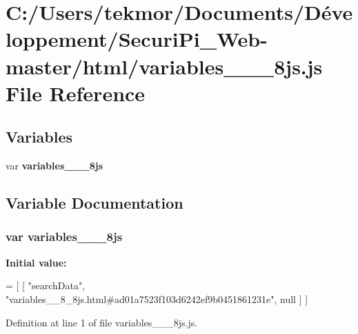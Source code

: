 \section{C\+:/\+Users/tekmor/\+Documents/\+Développement/\+Securi\+Pi\+\_\+\+Web-\/master/html/variables\+\_\+\+\_\+\_\+8js.js File Reference}
\label{variables____8__8js_8js}
\subsection*{Variables}
\begin{DoxyCompactItemize}
\item 
var {\bf variables\+\_\+\+\_\+\_\+8js}
\end{DoxyCompactItemize}


\subsection{Variable Documentation}
\subsubsection[{variables\+\_\+\+\_\+8\+\_\+8js}]{\setlength{\rightskip}{0pt plus 5cm}var variables\+\_\+\+\_\+\_\+8js}\label{variables____8__8js_8js_ac0e42b3cfc6c231139cee98b6152148d}
{\bfseries Initial value\+:}
\begin{DoxyCode}
=
[
    [ \textcolor{stringliteral}{"searchData"}, \textcolor{stringliteral}{"variables\_\_8\_8js.html#ad01a7523f103d6242ef9b0451861231e"}, null ]
]
\end{DoxyCode}


Definition at line 1 of file variables\+\_\+\+\_\+\_\+8js.\+js.


